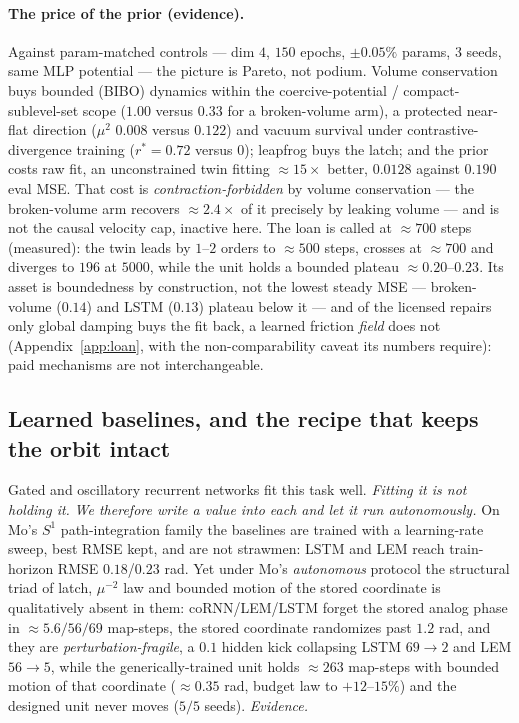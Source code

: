 \documentclass{article}
\begin{document}
\paragraph{The price of the prior (evidence).} Against param-matched controls --- dim $4$, $150$ epochs, $\pm0.05\%$ params, $3$ seeds, same MLP potential --- the picture is Pareto, not podium. Volume conservation buys bounded (BIBO) dynamics within the coercive-potential / compact-sublevel-set scope ($1.00$ versus $0.33$ for a broken-volume arm), a protected near-flat direction ($\mu^2$ $0.008$ versus $0.122$) and vacuum survival under contrastive-divergence training ($r^*=0.72$ versus $0$); leapfrog buys the latch; and the prior costs raw fit, an unconstrained twin fitting $\approx15\times$ better, $0.0128$ against $0.190$ eval MSE. That cost is \emph{contraction-forbidden} by volume conservation --- the broken-volume arm recovers $\approx2.4\times$ of it precisely by leaking volume --- and is not the causal velocity cap, inactive here. The loan is called at $\approx700$ steps (measured): the twin leads by $1$--$2$ orders to $\approx500$ steps, crosses at $\approx700$ and diverges to $196$ at $5000$, while the unit holds a bounded plateau $\approx0.20$--$0.23$. Its asset is boundedness by construction, not the lowest steady MSE --- broken-volume ($0.14$) and LSTM ($0.13$) plateau below it --- and of the licensed repairs only global damping buys the fit back, a learned friction \emph{field} does not (Appendix~\ref{app:loan}, with the non-comparability caveat its numbers require): paid mechanisms are not interchangeable.

\subsection{Learned baselines, and the recipe that keeps the orbit intact}\label{sec:baselines}

Gated and oscillatory recurrent networks fit this task well. \emph{Fitting it is not holding it.} \emph{We therefore write a value into each and let it run autonomously.} On Mo's $S^1$ path-integration family the baselines are trained with a learning-rate sweep, best RMSE kept, and are not strawmen: LSTM and LEM reach train-horizon RMSE $0.18$/$0.23$ rad. Yet under Mo's \emph{autonomous} protocol the structural triad of latch, $\mu^{-2}$ law and bounded motion of the stored coordinate is qualitatively absent in them: coRNN/LEM/LSTM forget the stored analog phase in $\approx5.6/56/69$ map-steps, the stored coordinate randomizes past $1.2$ rad, and they are \emph{perturbation-fragile}, a $0.1$ hidden kick collapsing LSTM $69\to2$ and LEM $56\to5$, while the generically-trained unit holds $\approx263$ map-steps with bounded motion of that coordinate ($\approx0.35$ rad, budget law to $+12$--$15\%$) and the designed unit never moves ($5/5$ seeds). \emph{Evidence.}
\end{document}
